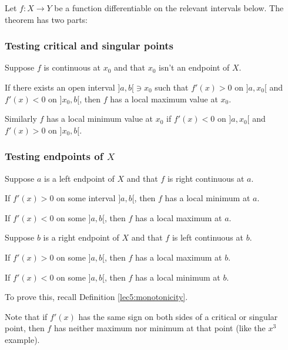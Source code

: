 \begin{theorem}
	Let $f \colon X \to Y$ be a function differentiable on the relevant intervals below.
	The theorem has two parts:

	\subsubsection*{Testing critical and singular points}

	Suppose $f$ is continuous at $x_0$ and that $x_0$ isn't an endpoint of $X$.
	\begin{romanlist}
		\item If there exists an open interval ${]{a, b}[} \ni x_0$ such that $f'(x) > 0$ on ${]{a, x_0}[}$ and $f'(x) < 0$ on ${]{x_0, b}[}$, then $f$ has a local maximum value at $x_0$.
		\item Similarly $f$ has a local minimum value at $x_0$ if $f'(x) < 0$ on ${]{a, x_0}[}$ and $f'(x) > 0$ on ${]{x_0, b}[}$.
	\end{romanlist}

	\subsubsection*{Testing endpoints of $X$}

	Suppose $a$ is a left endpoint of $X$ and that $f$ is right continuous at $a$.
	\begin{romanlist}
		\setcounter{enumi}{2}
		\item If $f'(x) > 0$ on some interval ${]{a, b}[}$, then $f$ has a local minimum at $a$.
		\item If $f'(x) < 0$ on some ${]{a, b}[}$, then $f$ has a local maximum at $a$.
	\end{romanlist}
	Suppose $b$ is a right endpoint of $X$ and that $f$ is left continuous at $b$.
	\begin{romanlist}
		\setcounter{enumi}{4}
		\item If $f'(x) > 0$ on some ${]{a, b}[}$, then $f$ has a local maximum at $b$.
		\item If $f'(x) < 0$ on some ${]{a, b}[}$, then $f$ has a local minimum at $b$.
	\end{romanlist}
\end{theorem}

\begin{exercise}
	To prove this, recall Definition \ref{lec5:monotonicity}.
\end{exercise}

\noindent
Note that if $f'(x)$ has the same sign on both sides of a critical or singular point, then $f$ has neither maximum nor minimum at that point (like the $x^3$ example).

